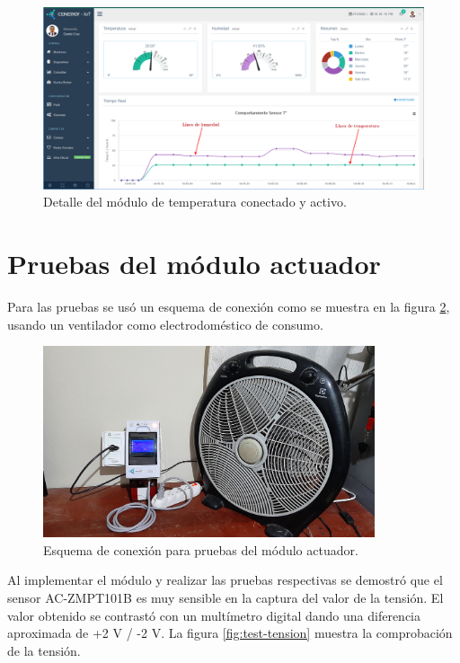 \begin{landscape} %
\begin{figure}[htpb]
\centering 
\includegraphics[width=1.7\textwidth]{./Figures/test/temp/detalle.png}
\caption{Detalle del módulo de temperatura conectado y activo.}
\label{fig:temp-detalle}
\end{figure}
\end{landscape} %

\section{Pruebas del módulo actuador}
Para las pruebas se usó un esquema de conexión como se muestra en la figura \ref{fig:test-esquema}, usando un ventilador como electrodoméstico de consumo. 
\vspace{0.5cm}
\begin{figure}[htpb]
\centering 
\includegraphics[width=0.87\textwidth]{./Figures/test/consumo/esquema.png}
\caption{Esquema de conexión para pruebas del módulo actuador.}
\label{fig:test-esquema}
\end{figure}

Al implementar el módulo y realizar las pruebas respectivas se demostró que el sensor AC-ZMPT101B es muy sensible en la captura del valor de la tensión. El valor obtenido se contrastó con un multímetro digital dando una diferencia aproximada de +2 V / -2 V. La figura \ref{fig:test-tension} muestra la comprobación de la tensión.

